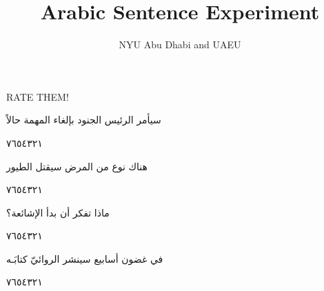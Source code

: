 \documentclass[11pt, a4paper]{article}
\begin{document}
	\title{Arabic Sentence Experiment}
	\author{NYU Abu Dhabi and UAEU}
	
	\maketitle
	
	{RATE THEM!}
	
	\vfill\clearpage
	
	{\begin{flushright}
\textarabic{سيأمر الرئيس الجنود بإلغاء المهمة حالاً}
\end{flushright}

\begin{center}
        \hfill\textarabic{٧}\hfill\textarabic{٦}\hfill\textarabic{٥}\hfill\textarabic{٤}\hfill\textarabic{٣}\hfill\textarabic{٢}\hfill\textarabic{١}
        \end{center}


\vspace{0.5\baselineskip}\begin{flushright}
\textarabic{هناك نوع من المرض سيقتل الطيور}
\end{flushright}

\begin{center}
        \hfill\textarabic{٧}\hfill\textarabic{٦}\hfill\textarabic{٥}\hfill\textarabic{٤}\hfill\textarabic{٣}\hfill\textarabic{٢}\hfill\textarabic{١}
        \end{center}


\vspace{0.5\baselineskip}\begin{flushright}
\textarabic{ماذا تفكر أن بدأ الإشائعة؟}
\end{flushright}

\begin{center}
        \hfill\textarabic{٧}\hfill\textarabic{٦}\hfill\textarabic{٥}\hfill\textarabic{٤}\hfill\textarabic{٣}\hfill\textarabic{٢}\hfill\textarabic{١}
        \end{center}


\vspace{0.5\baselineskip}\begin{flushright}
\textarabic{في غضون أسابيع سينشر الروائيّ كتابَـه}
\end{flushright}

\begin{center}
        \hfill\textarabic{٧}\hfill\textarabic{٦}\hfill\textarabic{٥}\hfill\textarabic{٤}\hfill\textarabic{٣}\hfill\textarabic{٢}\hfill\textarabic{١}
        \end{center}


}
\end{document}
